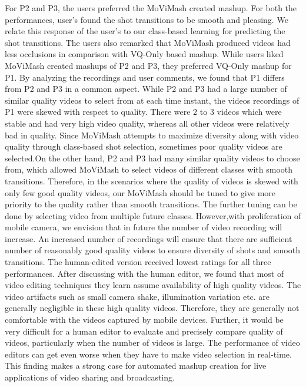 \documentclass{sig-alternate}
\begin{document}
For P2 and P3, the users preferred the MoViMash created mashup.
For both the performances, user's found the shot transitions to be
smooth and pleasing. We relate this response of the user's to our
class-based learning for predicting the shot transitions. The users
also remarked that MoViMash produced videos had less occlusions
in comparison with VQ-Only based mashup. While users liked MoViMash created mashups of P2 and P3,
they preferred VQ-Only mashup for P1. By analyzing the recordings and user comments, we found that P1 differs from P2 and P3 in
a common aspect. While P2 and P3 had a large number of similar
quality videos to select from at each time instant, the videos recordings of P1 were skewed with respect to quality. There were 2 to 3 videos which were stable and had very high video quality, whereas all other videos were relatively bad in quality. Since MoViMash attempts to maximize diversity along with video quality through class-based shot selection, sometimes poor quality videos are selected.On the other hand, P2 and P3 had many similar quality videos
to choose from, which allowed MoViMash to select videos of different classes with smooth transitions. Therefore, in the scenarios where the quality of videos is skewed with only few good quality videos, our MoViMash should be tuned to give more priority to the quality rather than smooth transitions. The further tuning can be done by selecting video from multiple future classes. However,with proliferation of mobile camera, we envision that in future the
number of video recording will increase. An increased number of
recordings will ensure that there are sufficient number of reasonably good quality videos to ensure diversity of shots and smooth transitions.
The human-edited version received lowest ratings for all three
performances. After discussing with the human editor, we found
that most of video editing techniques they learn assume availability
of high quality videos. The video artifacts such as small camera shake, illumination variation etc. are generally negligible in these
high quality videos. Therefore, they are generally not comfortable
with the videos captured by mobile devices. Further, it would be
very difficult for a human editor to evaluate and precisely compare
quality of videos, particularly when the number of videos is large.
The performance of video editors can get even worse when they
have to make video selection in real-time. This finding makes a
strong case for automated mashup creation for live applications of
video sharing and broadcasting.
\end{document}
